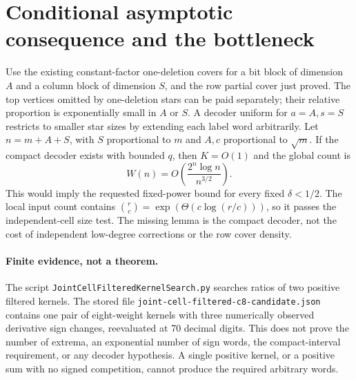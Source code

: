 \documentclass[11pt]{article}
\begin{document}
\section{Conditional asymptotic consequence and the bottleneck}

Use the existing constant-factor one-deletion covers for a bit block
of dimension $A$ and a column block of dimension $S$, and the row
partial cover just proved. The top vertices omitted by one-deletion
stars can be paid separately; their relative proportion is
exponentially small in $A$ or $S$. A decoder uniform for $a=A,s=S$
restricts to smaller star sizes by extending each label word
arbitrarily. Let $n=m+A+S$, with $S$ proportional to $m$ and
$A,c$ proportional to $\sqrt m$. If the compact decoder exists with
bounded $q$, then $K=O(1)$ and the global count is
\[
 W(n)=O\left(\frac{2^n\log n}{n^{3/2}}\right).
\]
This would imply the requested fixed-power bound for every fixed
$\delta<1/2$. The local input count contains
$\binom rc=\exp(\Theta(c\log(r/c)))$, so it passes the independent-cell
size test. The missing lemma is the compact decoder, not the cost of
independent low-degree corrections or the row cover density.

\paragraph{Finite evidence, not a theorem.}
The script \texttt{JointCellFilteredKernelSearch.py} searches ratios
of two positive filtered kernels. The stored file
\texttt{joint-cell-filtered-c8-candidate.json} contains one pair of
eight-weight kernels with three numerically observed derivative
sign changes, reevaluated at 70 decimal digits. This does not prove
the number of extrema, an exponential number of sign words, the
compact-interval requirement, or any decoder hypothesis. A
single positive kernel, or a positive sum with no signed
competition, cannot produce the required arbitrary words.
\end{document}
